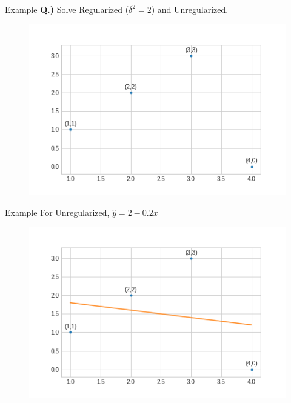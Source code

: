 \documentclass{beamer}
\begin{document}
\begin{frame}{Example}
\vspace{0.4cm}
\textbf{Q.)} Solve Regularized ($\delta^2 = 2$) and Unregularized.
\vspace{-0.6cm}
\begin{figure}
\includegraphics[width=\linewidth]{ridge/ques_1.png}
\end{figure}
\end{frame}

\begin{frame}{Example}
\vspace{0.4cm}
For Unregularized, $\hat{y} = 2-0.2x$
\vspace{-0.6cm}
\begin{figure}
\includegraphics[width=\linewidth]{ridge/ques_2.png}
\end{figure}
\end{frame}
\end{document}
